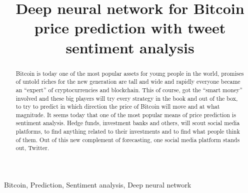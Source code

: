 \documentclass[conference]{IEEEtran}
\begin{document}
\title{Deep neural network for Bitcoin price prediction with tweet sentiment analysis\\
}

\author{

\and
{}

\and
{}
}

\maketitle

\begin{abstract}
Bitcoin is today one of the most popular assets for young people in the world, promises of untold riches for the new generation are tall and wide and rapidly everyone became an “expert” of cryptocurrencies and blockchain. This of course, got the “smart money” involved and these big players will try every strategy in the book and out of the box, to try to predict in which direction the price of Bitcoin will move and at what magnitude. It seems today that one of the most popular means of price prediction is sentiment analysis. Hedge funds, investment banks and others, will scout social media platforms, to find anything related to their investments and to find what people think of them. Out of this new complement of forecasting, one social media platform stands out, Twitter.
\end{abstract}

\begin{IEEEkeywords}
Bitcoin, Prediction, Sentiment analysis, Deep neural network
\end{IEEEkeywords}
\end{document}

